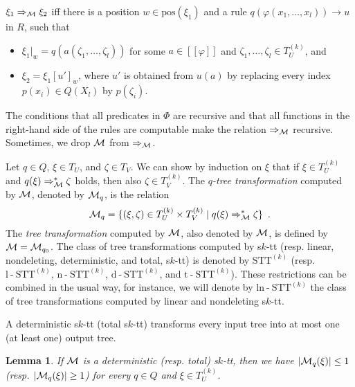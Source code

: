 \documentclass[10pt]{scrartcl}
\newtheorem{lm}[df]{Lemma}
\newcommand{\seml}{[\![}
\newcommand{\semr}{]\!]}
\newcommand{\pos}{\mathrm{pos}}
\newcommand{\STT}{\mathrm{STT}}
\newcommand{\lSTT}{\mathrm{l}\n\mathrm{STT}}
\newcommand{\tSTT}{\mathrm{t}\n\mathrm{STT}}
\newcommand{\dSTT}{\mathrm{d}\n\mathrm{STT}}
\newcommand{\nSTT}{\mathrm{n}\n\mathrm{STT}}
\newcommand{\lnSTT}{\mathrm{ln}\n\mathrm{STT}}
\newcommand{\M}{{\cal M}}
\DeclareMathOperator{\n}{-}
\def\ui#1{^{(#1)}}
\begin{document}
$\xi_1 \Rightarrow_{\M} \xi_2$ iff there is a position $w \in \pos(\xi_1)$ and a rule $q(\varphi(x_1,\ldots,x_l)) \to u$ in $R$,  such that

\begin{itemize}
\item $\xi_1|_w = q(a(\zeta_1,\ldots,\zeta_l))$ for some $a \in \seml \varphi \semr$ and $\zeta_1,\ldots,\zeta_l \in T_U^{(k)}$, and
\item $\xi_2=\xi_1[u']_w$, where $u'$ is obtained from $u(a)$ by replacing every index $p(x_i) \in Q(X_l)$ by $p(\zeta_i)$. 
\end{itemize} 
The conditions that all predicates in $\Phi$ are recursive and that all functions in the right-hand side of the rules are computable make the relation $\Rightarrow_{\M}$ recursive. Sometimes, we drop $\M$ from $\Rightarrow_{\M}$. 

Let $q \in Q$, $\xi \in T_U$, and $\zeta \in T_V$. We can show by induction on $\xi$ that
if $\xi \in T_U\ui k$ and $q(\xi)\Rightarrow_{\M}^* \zeta$ holds, then also  $\zeta \in T_V\ui k$.
The \emph{$q$-tree transformation} computed by $\M$, denoted by $\M_q$, is the relation
\[
\M_q = \{(\xi,\zeta) \in T_U^{(k)} \times T_V^{(k)} \mid q(\xi) \Rightarrow_{\M}^* \zeta\}\enspace.
\]
The \emph{tree transformation} computed by $\M$, also denoted by $\M$, is defined by $\M = \M_{q_0}$.
 The class of
tree transformations computed by s$k$-tt (resp. linear, nondeleting, deterministic, and total,  s$k$-tt) is denoted by $\STT\ui k$ (resp. $\lSTT\ui k$,
$\nSTT\ui k$, $\dSTT\ui k$, and $\tSTT\ui k$). These restrictions  can
be combined in the usual way, for instance, we will denote by
$\lnSTT\ui k$ the class of tree transformations computed by linear and
nondeleting  s$k$-tt.



A deterministic s$k$-tt (total s$k$-tt) transforms every input tree
into at most one (at least one) output tree.

\begin{lm}\rm \label{dt-lemma-stt} If $\M$ is a deterministic (resp. total) s$k$-tt, then  we have $|\M_q(\xi)|\le 1$  (resp. $|\M_q(\xi)|\ge 1$) for every $q \in Q$ and $\xi \in T_U\ui k$.
\end{lm}
\end{document}
